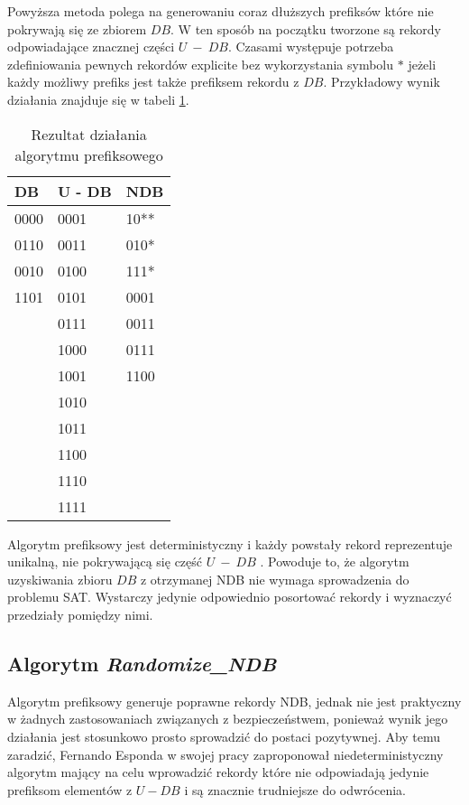 \begin{explanation}
    Powyższa metoda polega na generowaniu coraz dłuższych prefiksów które nie pokrywają się ze zbiorem $DB$.
    W ten sposób na początku tworzone są rekordy odpowiadające znacznej części $U~-~DB$. Czasami występuje potrzeba zdefiniowania pewnych rekordów explicite bez wykorzystania symbolu $*$ jeżeli każdy możliwy prefiks jest także prefiksem rekordu z $DB$. 
    Przykładowy wynik działania znajduje się w tabeli \ref{tbl:prefix_results}.
    
    \begin{table}[h]
        \centering
        \begin{tabular}{|l|l|l|}
            \hline
            DB   & U - DB & NDB  \\ \hline
            0000 & 0001   & 10** \\
            0110 & 0011   & 010* \\
            0010 & 0100   & 111* \\
            1101 & 0101   & 0001 \\
            & 0111   & 0011 \\
            & 1000   & 0111 \\
            & 1001   & 1100 \\
            & 1010   &      \\
            & 1011   &      \\
            & 1100   &      \\
            & 1110   &      \\
            & 1111   &      \\ \hline
        \end{tabular}
        \caption{Rezultat działania algorytmu prefiksowego}
        \label{tbl:prefix_results}
    \end{table}
    
    
\end{explanation}
Algorytm prefiksowy jest deterministyczny i każdy powstały rekord reprezentuje unikalną, nie pokrywającą się część $U~-~DB$ \cite{NRI-Esponda}.
Powoduje to, że algorytm uzyskiwania zbioru $DB$ z otrzymanej NDB nie wymaga sprowadzenia do problemu SAT. Wystarczy jedynie odpowiednio posortować rekordy i wyznaczyć przedziały pomiędzy nimi.

\subsection{Algorytm \textit{Randomize\_NDB}}
Algorytm prefiksowy generuje poprawne rekordy NDB, jednak nie jest praktyczny w żadnych zastosowaniach związanych z bezpieczeństwem, ponieważ wynik jego działania jest stosunkowo prosto sprowadzić do postaci pozytywnej. Aby temu zaradzić, Fernando Esponda w swojej pracy\cite{NRI-Esponda} zaproponował niedeterministyczny algorytm mający na celu wprowadzić rekordy które nie odpowiadają jedynie prefiksom elementów z $U - DB$ i są znacznie trudniejsze do odwrócenia.
